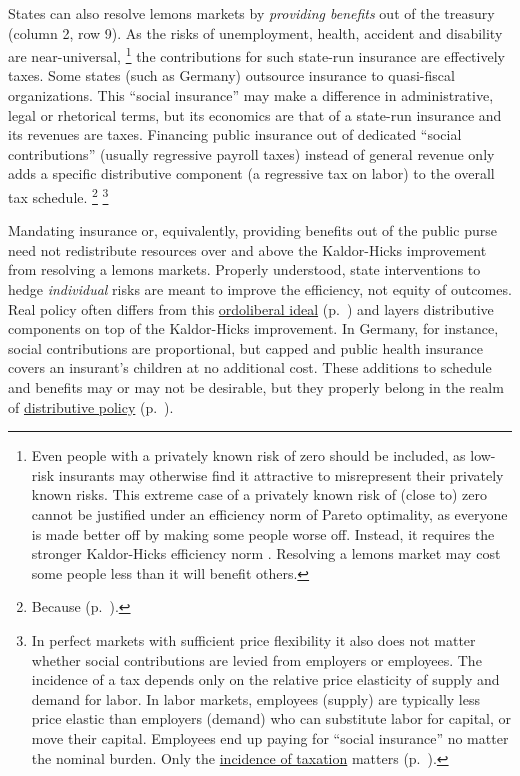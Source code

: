 States can also resolve lemons markets by \emph{providing benefits} out of the treasury (column 2, row 9).
As the risks of unemployment, health, accident and disability are near-universal,
\footnote{
	Even people with a privately known risk of zero should be included, as low-risk insurants may otherwise find it attractive to misrepresent their privately known risks.
	This extreme case of a privately known risk of (close to) zero cannot be justified under an efficiency norm of Pareto optimality, as everyone is made better off by making some people worse off.
	Instead, it requires the stronger Kaldor-Hicks efficiency norm \citep{Kaldor1939,Hicks1939}.
	Resolving a lemons market may cost some people less than it will benefit others.
}
the contributions for such state-run insurance are effectively taxes.
Some states (such as Germany) outsource insurance to quasi-fiscal organizations.
This ``social insurance'' may make a difference in administrative, legal or rhetorical terms, but its economics are that of a state-run insurance and its revenues are taxes.
Financing public insurance out of dedicated ``social contributions'' (usually regressive payroll taxes) instead of general revenue only adds a specific distributive component (a regressive tax on labor) to the overall tax schedule.
\footnote{
	Because  (p.~\pageref{sec:fiscal-redistribution-and-revenue-are-one}).
}
\footnote{
	In perfect markets with sufficient price flexibility it also does not matter whether social contributions are levied from employers or employees.
	The incidence of a tax depends only on the relative price elasticity of supply and demand for labor.
	In labor markets, employees (supply) are typically less price elastic than employers (demand) who can substitute labor for capital, or move their capital.
	Employees end up paying for ``social insurance'' no matter the nominal burden.
	Only the \hyperref[sec:well-determined-incidence]{incidence of taxation} matters (p.~\pageref{sec:well-determined-incidence}).
}

Mandating insurance or, equivalently, providing benefits out of the public purse need not redistribute resources over and above the Kaldor-Hicks improvement from resolving a lemons markets.
Properly understood, state interventions to hedge \emph{individual} risks are meant to improve the efficiency, not equity of outcomes.
Real policy often differs from this \hyperref[sec:ordoliberal-hygiene]{ordoliberal ideal} (p.~\pageref{sec:ordoliberal-hygiene}) and layers distributive components on top of the Kaldor-Hicks improvement.
In Germany, for instance, social contributions are proportional, but capped and public health insurance covers an insurant's children at no additional cost.
These additions to schedule and benefits may or may not be desirable, but they properly belong in the realm of \hyperref[sec:distribution]{distributive policy} (p.~\pageref{sec:distribution}).

